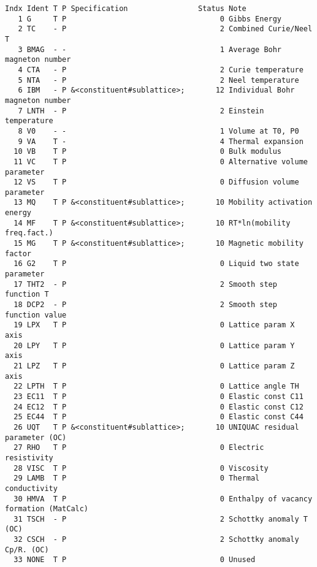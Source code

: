 \documentclass{article}
\begin{document}
\begin{appendices}
\begin{table}[!h]
{\small
\begin{verbatim}
Indx Ident T P Specification                Status Note
   1 G     T P                                   0 Gibbs Energy
   2 TC    - P                                   2 Combined Curie/Neel T
   3 BMAG  - -                                   1 Average Bohr magneton number
   4 CTA   - P                                   2 Curie temperature
   5 NTA   - P                                   2 Neel temperature
   6 IBM   - P &<constituent#sublattice>;       12 Individual Bohr magneton number
   7 LNTH  - P                                   2 Einstein temperature
   8 V0    - -                                   1 Volume at T0, P0
   9 VA    T -                                   4 Thermal expansion
  10 VB    T P                                   0 Bulk modulus
  11 VC    T P                                   0 Alternative volume parameter
  12 VS    T P                                   0 Diffusion volume parameter
  13 MQ    T P &<constituent#sublattice>;       10 Mobility activation energy
  14 MF    T P &<constituent#sublattice>;       10 RT*ln(mobility freq.fact.)
  15 MG    T P &<constituent#sublattice>;       10 Magnetic mobility factor
  16 G2    T P                                   0 Liquid two state parameter
  17 THT2  - P                                   2 Smooth step function T
  18 DCP2  - P                                   2 Smooth step function value
  19 LPX   T P                                   0 Lattice param X axis
  20 LPY   T P                                   0 Lattice param Y axis
  21 LPZ   T P                                   0 Lattice param Z axis
  22 LPTH  T P                                   0 Lattice angle TH
  23 EC11  T P                                   0 Elastic const C11
  24 EC12  T P                                   0 Elastic const C12
  25 EC44  T P                                   0 Elastic const C44
  26 UQT   T P &<constituent#sublattice>;       10 UNIQUAC residual parameter (OC)
  27 RHO   T P                                   0 Electric resistivity
  28 VISC  T P                                   0 Viscosity
  29 LAMB  T P                                   0 Thermal conductivity
  30 HMVA  T P                                   0 Enthalpy of vacancy formation (MatCalc)
  31 TSCH  - P                                   2 Schottky anomaly T (OC)
  32 CSCH  - P                                   2 Schottky anomaly Cp/R. (OC)
  33 NONE  T P                                   0 Unused
\end{verbatim}
  }
\end{table}
 
\end{appendices}
\end{document}
